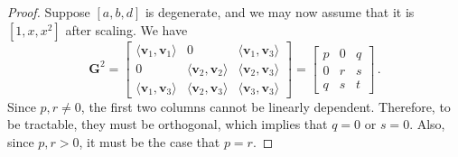 \documentclass[11pt]{article}
\begin{document}
\begin{proof}
  Suppose $[a, b, d]$ is degenerate, and we may now assume that it is $[1, x, x^2]$ after scaling.
  We have
  \[
    \mathbf{G}^2 = \begin{bmatrix}
      \langle \mathbf{v}_1, \mathbf{v}_1 \rangle & 0 & \langle \mathbf{v}_1, \mathbf{v}_3 \rangle \\
      0 & \langle \mathbf{v}_2, \mathbf{v}_2 \rangle & \langle \mathbf{v}_2, \mathbf{v}_3 \rangle \\
      \langle \mathbf{v}_1, \mathbf{v}_3 \rangle & \langle \mathbf{v}_2, \mathbf{v}_3 \rangle & \langle \mathbf{v}_3, \mathbf{v}_3 \rangle 
      \end{bmatrix} = \begin{bmatrix}
      p & 0 & q \\
      0 & r & s \\
      q & s & t
    \end{bmatrix}
    \, .
  \]
  Since $p, r \ne 0$, the first two columns cannot be linearly dependent. Therefore, to be tractable, they must be orthogonal, which implies that $q = 0$ or $s = 0$.
Also, since $p, r > 0$, it must be the case that $p = r$.


\end{proof}
\end{document}
